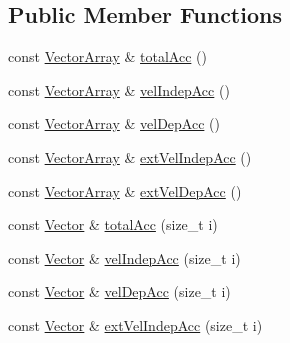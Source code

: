 \subsection*{Public Member Functions}
\begin{DoxyCompactItemize}
\item 
const \mbox{\hyperlink{class_space_h_1_1_interaction_a9aaccf9a34d875881d9448acf7aaf009}{Vector\+Array}} \& \mbox{\hyperlink{class_space_h_1_1_interaction_ae798bbb6d97bc4ff9af4d59a117b2b40}{total\+Acc}} ()
\item 
const \mbox{\hyperlink{class_space_h_1_1_interaction_a9aaccf9a34d875881d9448acf7aaf009}{Vector\+Array}} \& \mbox{\hyperlink{class_space_h_1_1_interaction_a5b5da26af45601a300ec9e0ad7fa2141}{vel\+Indep\+Acc}} ()
\item 
const \mbox{\hyperlink{class_space_h_1_1_interaction_a9aaccf9a34d875881d9448acf7aaf009}{Vector\+Array}} \& \mbox{\hyperlink{class_space_h_1_1_interaction_a87ecd610557033d30958f4eb420b8f88}{vel\+Dep\+Acc}} ()
\item 
const \mbox{\hyperlink{class_space_h_1_1_interaction_a9aaccf9a34d875881d9448acf7aaf009}{Vector\+Array}} \& \mbox{\hyperlink{class_space_h_1_1_interaction_a13f7c7f61c101a863c2dbedb17c31c2e}{ext\+Vel\+Indep\+Acc}} ()
\item 
const \mbox{\hyperlink{class_space_h_1_1_interaction_a9aaccf9a34d875881d9448acf7aaf009}{Vector\+Array}} \& \mbox{\hyperlink{class_space_h_1_1_interaction_a15494ade2b2d4e9c972718bbcf40dd4d}{ext\+Vel\+Dep\+Acc}} ()
\item 
const \mbox{\hyperlink{class_space_h_1_1_interaction_ad6d656d30b9272a5f690b0412a4a9a86}{Vector}} \& \mbox{\hyperlink{class_space_h_1_1_interaction_abb0464f58a3410788de0d3eb4ff76867}{total\+Acc}} (size\+\_\+t i)
\item 
const \mbox{\hyperlink{class_space_h_1_1_interaction_ad6d656d30b9272a5f690b0412a4a9a86}{Vector}} \& \mbox{\hyperlink{class_space_h_1_1_interaction_af2360c5ed9f347420c6ecbe77fc1357d}{vel\+Indep\+Acc}} (size\+\_\+t i)
\item 
const \mbox{\hyperlink{class_space_h_1_1_interaction_ad6d656d30b9272a5f690b0412a4a9a86}{Vector}} \& \mbox{\hyperlink{class_space_h_1_1_interaction_a4f4cf3f4d89514e15bf5f31bdf141a1d}{vel\+Dep\+Acc}} (size\+\_\+t i)
\item 
const \mbox{\hyperlink{class_space_h_1_1_interaction_ad6d656d30b9272a5f690b0412a4a9a86}{Vector}} \& \mbox{\hyperlink{class_space_h_1_1_interaction_aac3afcba9593992baf9311b50265eb6d}{ext\+Vel\+Indep\+Acc}} (size\+\_\+t i)

\end{DoxyCompactItemize}
